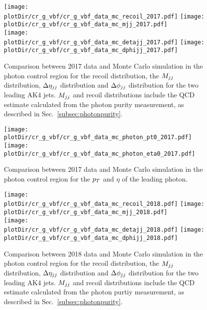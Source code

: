 \begin{figure}[htbp]
    \begin{center}
        \texttt{[image: \\plotDir/cr\_g\_vbf/cr\_g\_vbf\_data\_mc\_recoil\_2017.pdf]}
        \texttt{[image: \\plotDir/cr\_g\_vbf/cr\_g\_vbf\_data\_mc\_mjj\_2017.pdf]} \\
        \texttt{[image: \\plotDir/cr\_g\_vbf/cr\_g\_vbf\_data\_mc\_detajj\_2017.pdf]}
        \texttt{[image: \\plotDir/cr\_g\_vbf/cr\_g\_vbf\_data\_mc\_dphijj\_2017.pdf]}
    \end{center}
    \caption{Comparison between 2017 data and Monte Carlo simulation in the photon control region for
        the recoil distribution, the $M_{jj}$ distribution, $\Delta \eta_{jj}$ distribution and $\Delta \phi_{jj}$ distribution
        for the two leading AK4 jets. $M_{jj}$ and recoil distributions include the QCD estimate
        calculated from the photon purity measurement, as described in Sec.~\ref{subsec:photonpurity}. }
    \label{fig:Photon_vbfhinv_2017}
\end{figure}

\begin{figure}[htbp]
    \begin{center}
        \texttt{[image: \\plotDir/cr\_g\_vbf/cr\_g\_vbf\_data\_mc\_photon\_pt0\_2017.pdf]}
        \texttt{[image: \\plotDir/cr\_g\_vbf/cr\_g\_vbf\_data\_mc\_photon\_eta0\_2017.pdf]}
    \end{center}
    \caption{Comparison between 2017 data and Monte Carlo simulation in the photon control region for
        the $p_T$ and $\eta$ of the leading photon.}
    \label{fig:Photon2_vbfhinv_2017}
\end{figure}

\begin{figure}[htbp]
    \begin{center}
        \texttt{[image: \\plotDir/cr\_g\_vbf/cr\_g\_vbf\_data\_mc\_recoil\_2018.pdf]}
        \texttt{[image: \\plotDir/cr\_g\_vbf/cr\_g\_vbf\_data\_mc\_mjj\_2018.pdf]} \\
        \texttt{[image: \\plotDir/cr\_g\_vbf/cr\_g\_vbf\_data\_mc\_detajj\_2018.pdf]}
        \texttt{[image: \\plotDir/cr\_g\_vbf/cr\_g\_vbf\_data\_mc\_dphijj\_2018.pdf]}
    \end{center}
    \caption{Comparison between 2018 data and Monte Carlo simulation in the photon control region for
        the recoil distribution, the $M_{jj}$ distribution, $\Delta \eta_{jj}$ distribution and $\Delta \phi_{jj}$ distribution
        for the two leading AK4 jets. $M_{jj}$ and recoil distributions include the QCD estimate
        calculated from the photon purtiy measurement, as described in Sec.~\ref{subsec:photonpurity}. }
    \label{fig:Photon_vbfhinv_2018}
\end{figure}

